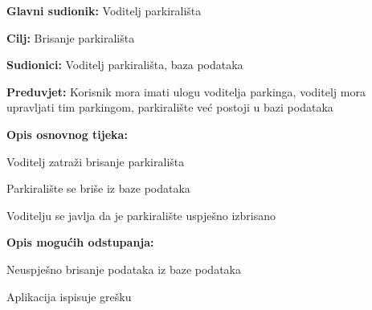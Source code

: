 					\begin{packed_item}
						
						\item \textbf{Glavni sudionik: }Voditelj parkirališta
						\item  \textbf{Cilj:} Brisanje parkirališta
						\item  \textbf{Sudionici:} Voditelj parkirališta, baza podataka
						\item  \textbf{Preduvjet:} Korisnik mora imati ulogu voditelja parkinga, voditelj mora upravljati tim parkingom, parkiralište već postoji u bazi podataka
						\item  \textbf{Opis osnovnog tijeka:}
						
						\item[] \begin{packed_enum}
							
							
							\item Voditelj zatraži brisanje parkirališta
							\item Parkiralište se briše iz baze podataka
							\item Voditelju se javlja da je parkiralište uspješno izbrisano
							
						\end{packed_enum}
						
						\item  \textbf{Opis mogućih odstupanja:}
						
						\item[] \begin{packed_item}
							
							\item[2.a] Neuspješno brisanje podataka iz baze podataka	
							\item[] \begin{packed_enum}
								
								\item Aplikacija ispisuje grešku
								
							\end{packed_enum}
						\end{packed_item}
					\end{packed_item}
				    \noindent {}
